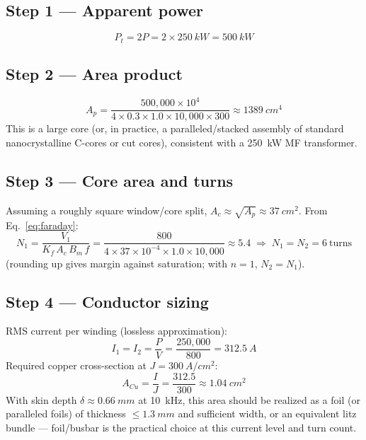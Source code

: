 \documentclass[11pt,a4paper]{article}
\begin{document}
\subsection*{Step 1 — Apparent power}
\begin{equation}
    P_t = 2P = 2 \times \SI{250}{kW} = \SI{500}{kW}
\end{equation}

\subsection*{Step 2 — Area product}
\begin{equation}
    A_p = \frac{500{,}000 \times 10^4}{4 \times 0.3 \times 1.0 \times 10{,}000 \times 300}
    \approx \SI{1389}{cm^4}
\end{equation}
This is a large core (or, in practice, a paralleled/stacked assembly of standard
nanocrystalline C-cores or cut cores), consistent with a \SI{250}{kW} MF transformer.

\subsection*{Step 3 — Core area and turns}
Assuming a roughly square window/core split, $A_c \approx \sqrt{A_p} \approx \SI{37}{cm^2}$.
From Eq.~\eqref{eq:faraday}:
\begin{equation}
    N_1 = \frac{V_1}{K_f \, A_c \, B_m \, f}
    = \frac{800}{4 \times 37\times10^{-4} \times 1.0 \times 10{,}000}
    \approx 5.4 \;\Rightarrow\; N_1 = N_2 = 6 \ \text{turns}
\end{equation}
(rounding up gives margin against saturation; with $n=1$, $N_2=N_1$).

\subsection*{Step 4 — Conductor sizing}
RMS current per winding (lossless approximation):
\begin{equation}
    I_1 = I_2 = \frac{P}{V} = \frac{250{,}000}{800} = \SI{312.5}{A}
\end{equation}
Required copper cross-section at $J=\SI{300}{A/cm^2}$:
\begin{equation}
    A_{Cu} = \frac{I}{J} = \frac{312.5}{300} \approx \SI{1.04}{cm^2}
\end{equation}
With skin depth $\delta \approx \SI{0.66}{mm}$ at \SI{10}{kHz}, this area should be
realized as a foil (or paralleled foils) of thickness $\le \SI{1.3}{mm}$ and
sufficient width, or an equivalent litz bundle — foil/busbar is the practical
choice at this current level and turn count.
\end{document}
